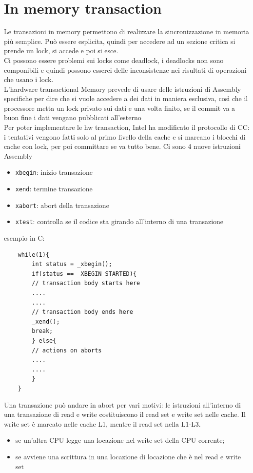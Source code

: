 \documentclass[12pt, oneside]{extbook} %
\begin{document}
\section{In memory transaction}
Le transazioni in memory permettono di realizzare la sincronizzazione in memoria più semplice. Può essere esplicita, quindi per accedere ad un sezione critica si prende un lock, si accede e poi si esce.\\ Ci possono essere problemi sui locks come deadlock, i deadlocks non sono componibili e quindi possono esserci delle inconsistenze nei risultati di operazioni che usano i lock.\\ L'hardware transactional Memory prevede di usare delle istruzioni di Assembly specifiche per dire che si vuole accedere a dei dati in maniera esclusiva, così che il processore metta un lock privato sui dati e una volta finito, se il commit va a buon fine i dati vengano pubblicati all'esterno\\ Per poter implementare le hw transaction, Intel ha modificato il protocollo di CC: i tentativi vengono fatti solo al primo livello della cache e si marcano i blocchi di cache con lock, per poi committare se va tutto bene. Ci sono 4 nuove istruzioni Assembly 
\begin{itemize}
	\item \texttt{xbegin}: inizio transazione
	\item \texttt{xend}: termine transazione
	\item \texttt{xabort}: abort della transazione
	\item \texttt{xtest}: controlla se il codice sta girando all'interno di una transazione
\end{itemize}
esempio in C:
\begin{lstlisting}
	while(1){
		int status = _xbegin();
		if(status == _XBEGIN_STARTED){
		// transaction body starts here
		....
		....
		// transaction body ends here
		_xend();
		break;
		} else{
		// actions on aborts
		....
		....
		}
	}
\end{lstlisting}
Una transazione può andare in abort per vari motivi: le istruzioni all'interno di una transazione di read e write costituiscono il read set e write set nelle cache. Il write set è marcato nelle cache L1, mentre il read set nella L1-L3.
\begin{itemize}
	\item se un'altra CPU legge una locazione nel write set della CPU corrente;
	\item se avviene una scrittura in una locazione di locazione che è nel read e write set
\end{itemize}
\end{document}
